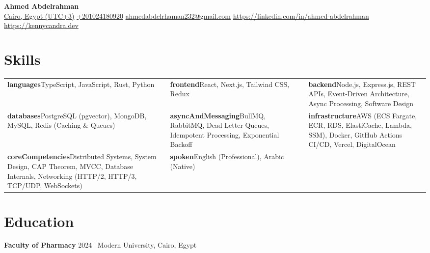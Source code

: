 \documentclass[11pt]{article}
\begin{document}
\begin{center}
{\LARGE \textbf{ Ahmed Abdelrahman }} \\[4pt]
\href{Cairo, Egypt (UTC+3)}{Cairo, Egypt (UTC+3)} \textbar{} \href{+201024180920}{+201024180920} \textbar{} \href{ahmedabdelrhaman232@gmail.com}{ahmedabdelrhaman232@gmail.com} \textbar{} \href{https://linkedin.com/in/ahmed-abdelrahman}{https://linkedin.com/in/ahmed-abdelrahman} \textbar{} \href{https://kennycandra.dev}{https://kennycandra.dev}
\end{center}

\section{Skills}
\begin{tabularx}{\textwidth}{X X X}
\textbf{languages}\newline TypeScript, JavaScript, Rust, Python & \textbf{frontend}\newline React, Next.js, Tailwind CSS, Redux & \textbf{backend}\newline Node.js, Express.js, REST APIs, Event-Driven Architecture, Async Processing, Software Design \\
\textbf{databases}\newline PostgreSQL (pgvector), MongoDB, MySQL, Redis (Caching \& Queues) & \textbf{asyncAndMessaging}\newline BullMQ, RabbitMQ, Dead-Letter Queues, Idempotent Processing, Exponential Backoff & \textbf{infrastructure}\newline AWS (ECS Fargate, ECR, RDS, ElastiCache, Lambda, SSM), Docker, GitHub Actions CI/CD, Vercel, DigitalOcean \\
\textbf{coreCompetencies}\newline Distributed Systems, System Design, CAP Theorem, MVCC, Database Internals, Networking (HTTP/2, HTTP/3, TCP/UDP, WebSockets) & \textbf{spoken}\newline English (Professional), Arabic (Native) &   \\
\end{tabularx}

\section{Education}
\textbf{Faculty of Pharmacy} \hfill 2024 \
Modern University, Cairo, Egypt
\end{document}
